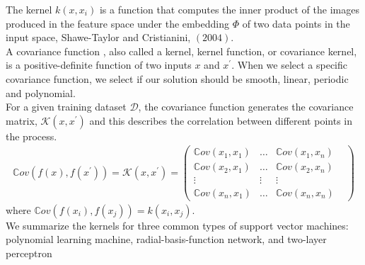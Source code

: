  The kernel $ k\left(x,x_{i}\right)$ is a function that computes the inner product of the images produced in
 the feature space under the embedding $\Phi$ of two data points in the input space, Shawe-Taylor and 
 Cristianini, $(2004)$. \\
 A covariance function , also called a kernel, kernel function, or
 covariance kernel, is a positive-definite function of two inputs
 $x$ and $x^{\prime}$. When we select a specific covariance function,
 we select if our solution should be smooth,
 linear, periodic and polynomial.\\
 For a given training dataset $\mathcal{D}$,
 the covariance function generates the covariance matrix, $ \mathcal{K}\left(x,x^{\prime}\right)$
 and this describes the correlation between different points in the process.
 \begin{align}
 	\mathbb{C}ov\left(f(x),f(x^{\prime}) \right) =
 \mathcal{K}\left(x,x^{\prime}\right)=
 	\begin{pmatrix}
 	\mathbb{C}ov\left(x_{1},x_{1}\right)  & \ldots & \mathbb{C}ov\left(x_{1},x_{n}\right)\\
 	\mathbb{C}ov\left(x_{2},x_{1}\right)  & \ldots & \mathbb{C}ov\left(x_{2},x_{n}\right)\\
 		\vdots &  \vdots & \vdots & \\
 		\mathbb{C}ov\left(x_{n},x_{1}\right) &\ldots&\mathbb{C}ov\left(x_{n},x_{n}\right)
 	\end{pmatrix}
 \end{align}
 where $\mathbb{C}ov\left(f(x_{i}),f(x_{j}) \right)=k\left(x_{i},x_{j}\right)$.\\
 We summarize the kernels for three common types of support vector machines:
 polynomial learning machine, radial-basis-function network, and two-layer perceptron
